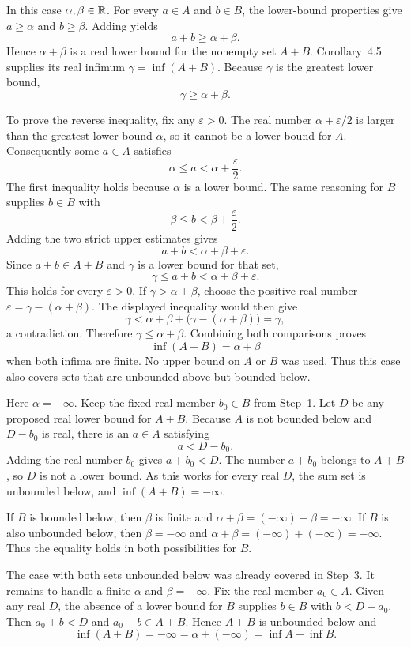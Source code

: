 In this case $\alpha,\beta\in\mathbb{R}$. For every $a\in A$ and $b\in B$,
the lower-bound properties give $a\ge\alpha$ and $b\ge\beta$.
Adding yields
\[
 a+b\ge\alpha+\beta.
\]
Hence $\alpha+\beta$ is a real lower bound for the nonempty set
$A+B$. Corollary~4.5 supplies its real infimum
$\gamma=\inf(A+B)$. Because $\gamma$ is the greatest lower bound,
\[
 \gamma\ge\alpha+\beta.
\]

To prove the reverse inequality, fix any $\varepsilon>0$.
The real number $\alpha+\varepsilon/2$ is larger than the greatest
lower bound $\alpha$, so it cannot be a lower bound for $A$.
Consequently some $a\in A$ satisfies
\[
 \alpha\le a<\alpha+\frac{\varepsilon}{2}.
\]
The first inequality holds because $\alpha$ is a lower bound.
The same reasoning for $B$ supplies $b\in B$ with
\[
 \beta\le b<\beta+\frac{\varepsilon}{2}.
\]
Adding the two strict upper estimates gives
\[
 a+b<\alpha+\beta+\varepsilon.
\]
Since $a+b\in A+B$ and $\gamma$ is a lower bound for that set,
\[
 \gamma\le a+b<\alpha+\beta+\varepsilon.
\]
This holds for every $\varepsilon>0$. If
$\gamma>\alpha+\beta$, choose the positive real number
$\varepsilon=\gamma-(\alpha+\beta)$. The displayed inequality
would then give
\[
 \gamma<\alpha+\beta+
 \bigl(\gamma-(\alpha+\beta)\bigr)=\gamma,
\]
a contradiction. Therefore $\gamma\le\alpha+\beta$.
Combining both comparisons proves
\[
 \inf(A+B)=\alpha+\beta
\]
when both infima are finite. No upper bound on $A$ or $B$ was used.
Thus this case also covers sets that are unbounded above but bounded
below.

Here $\alpha=-\infty$. Keep the fixed real member $b_0\in B$ from
Step~1. Let $D$ be any proposed real lower bound for $A+B$.
Because $A$ is not bounded below and $D-b_0$ is real, there is an
$a\in A$ satisfying
\[
 a<D-b_0.
\]
Adding the real number $b_0$ gives $a+b_0<D$. The number
$a+b_0$ belongs to $A+B$, so $D$ is not a lower bound.
As this works for every real $D$, the sum set is unbounded below,
and $\inf(A+B)=-\infty$.

If $B$ is bounded below, then $\beta$ is finite and
$\alpha+\beta=(-\infty)+\beta=-\infty$.
If $B$ is also unbounded below, then $\beta=-\infty$ and
$\alpha+\beta=(-\infty)+(-\infty)=-\infty$.
Thus the equality holds in both possibilities for $B$.

The case with both sets unbounded below was already covered in Step~3.
It remains to handle a finite $\alpha$ and $\beta=-\infty$.
Fix the real member $a_0\in A$. Given any real $D$, the absence
of a lower bound for $B$ supplies $b\in B$ with $b<D-a_0$.
Then $a_0+b<D$ and $a_0+b\in A+B$. Hence $A+B$ is unbounded
below and
\[
 \inf(A+B)=-\infty
 =\alpha+(-\infty)
 =\inf A+\inf B.
\]

